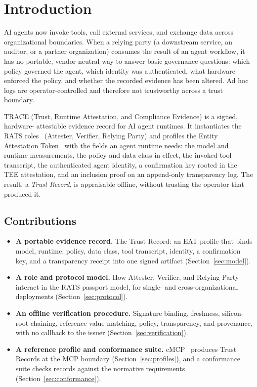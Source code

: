 \section{Introduction}
\label{sec:intro}

AI agents now invoke tools, call external services, and exchange data across
organizational boundaries. When a relying party (a downstream service, an auditor,
or a partner organization) consumes the result of an agent workflow, it has
no portable, vendor-neutral way to answer basic governance questions: which policy
governed the agent, which identity was authenticated, what hardware enforced the
policy, and whether the recorded evidence has been altered. Ad hoc logs are
operator-controlled and therefore not trustworthy across a trust boundary.

TRACE (Trust, Runtime Attestation, and Compliance Evidence) is a signed, hardware-
attestable evidence record for AI agent runtimes. It instantiates the RATS
roles~\citep{rats2021} (Attester, Verifier, Relying Party) and profiles the
Entity Attestation Token~\citep{eat2023} with the fields an agent runtime needs:
the model and runtime measurements, the policy and data class in effect, the
invoked-tool transcript, the authenticated agent identity, a confirmation key
rooted in the TEE attestation, and an inclusion proof on an append-only
transparency log. The result, a \emph{Trust Record}, is appraisable offline,
without trusting the operator that produced it.

\subsection*{Contributions}

\begin{itemize}[leftmargin=1.5em]
  \item \textbf{A portable evidence record.} The Trust Record: an EAT profile that
    binds model, runtime, policy, data class, tool transcript, identity, a
    confirmation key, and a transparency receipt into one signed artifact
    (Section~\ref{sec:model}).
  \item \textbf{A role and protocol model.} How Attester, Verifier, and Relying
    Party interact in the RATS passport model, for single- and cross-organizational
    deployments (Section~\ref{sec:protocol}).
  \item \textbf{An offline verification procedure.} Signature binding, freshness,
    silicon-root chaining, reference-value matching, policy, transparency, and
    provenance, with no callback to the issuer (Section~\ref{sec:verification}).
  \item \textbf{A reference profile and conformance suite.} cMCP~\citep{cmcp2026}
    produces Trust Records at the MCP boundary (Section~\ref{sec:profiles}), and a
    conformance suite checks records against the normative requirements
    (Section~\ref{sec:conformance}).
\end{itemize}

